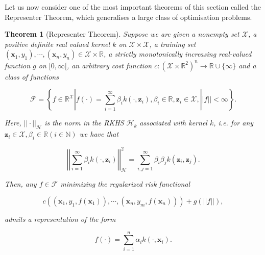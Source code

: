 \documentclass[12pt,a4paper,oneside]{book}
\newtheorem{Theorem}{Theorem}
\begin{document}



Let us now consider one of the most important theorems of this section called the Representer Theorem, which generalises a large class of optimisation problems. 

\begin{Theorem}[Representer Theorem]\label{Functional_Representer}
Suppose we are given a nonempty set $\mathcal{X}$, a positive definite real valued kernel $k$ on $\mathcal{X} \times \mathcal{X}$, a training set $(\bm{x}_1,y_1), \cdots, (\bm{x}_n,y_n) \in \mathcal{X} \times \mathbb{R}$, a strictly monotonically increasing real-valued function $g$ on $[0, \infty [$, an arbitrary cost function $c : (\mathcal{X} \times \mathbb{R}^2)^n \rightarrow \mathbb{R} \cup \lbrace \infty \rbrace$ and a class of functions

\begin{equation}
\mathcal{F} = \left\{ f \in \mathbb{R}^{\mathcal{X}} | f(\cdot) = \sum\limits_{i=1}^{\infty} \beta_i k(\cdot,\bm{z}_i) , \beta_i \in \mathbb{R}, \bm{z}_i \in \mathcal{X} , || f|| < \infty \right\}.
\end{equation} 

Here, $||\cdot ||_{\mathcal{H}}$ is the norm in the RKHS $\mathcal{H}_k$ associated with kernel $k$, i.e. for any $\bm{z}_i \in \mathcal{X}, \beta_i \in \mathbb{R} (i \in \mathbb{N})$ we have that 

\begin{equation}
\left| \left| \sum\limits_{i=1}^{\infty} \beta_i k(\cdot,\bm{z}_i) \right|\right|_{\mathcal{H}}^2  = \sum\limits_{i,j=1}^{\infty} \beta_i \beta_j k(\bm{z}_i,\bm{z}_j).
\end{equation}

Then, any $f \in \mathcal{F}$ minimizing the regularized risk functional 

\begin{equation}\label{Functional_RegularizedRisk}
c((\bm{x}_1, y_1, f(\bm{x}_1)), \cdots , (\bm{x}_n, y_m, f(\bm{x}_n))) + g(||f||),
\end{equation}

admits a representation of the form 

\begin{equation}
f(\cdot) = \sum\limits_{i=1}^{n} \alpha_i k(\cdot,\bm{x}_i).
\end{equation}
\end{Theorem}
\end{document}
